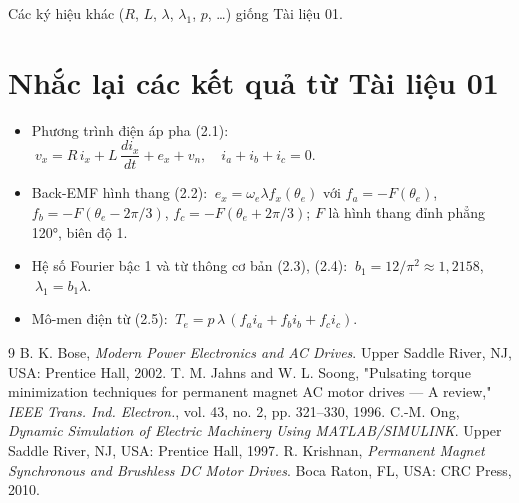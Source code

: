 \documentclass[11pt,a4paper]{article}
\begin{document}
Các ký hiệu khác ($R$, $L$, $\lambda$, $\lambda_1$, $p$, \ldots{}) giống Tài liệu 01.

\section*{Nhắc lại các kết quả từ Tài liệu 01}

\begin{itemize}[leftmargin=*]
\item Phương trình điện áp pha (2.1): $\ v_x = R\,i_x + L\,\dfrac{di_x}{dt} + e_x + v_n,\quad i_a+i_b+i_c = 0.$
\item Back-EMF hình thang (2.2): $\ e_x = \omega_e\lambda f_x(\theta_e)$ với $f_a = -F(\theta_e)$, $f_b = -F(\theta_e - 2\pi/3)$, $f_c = -F(\theta_e + 2\pi/3)$; $F$ là hình thang đỉnh phẳng 120°, biên độ 1.
\item Hệ số Fourier bậc 1 và từ thông cơ bản (2.3), (2.4): $\ b_1 = 12/\pi^2 \approx 1{,}2158$, $\ \lambda_1 = b_1\lambda$.
\item Mô-men điện từ (2.5): $\ T_e = p\,\lambda\,(f_a i_a + f_b i_b + f_c i_c).$
\end{itemize}

\setcounter{section}{2}


\begin{thebibliography}{9}
\small
{} B. K. Bose, \emph{Modern Power Electronics and AC Drives}. Upper Saddle River, NJ, USA: Prentice Hall, 2002.
 T. M. Jahns and W. L. Soong, "Pulsating torque minimization techniques for permanent magnet AC motor drives — A review," \emph{IEEE Trans. Ind. Electron.}, vol. 43, no. 2, pp. 321–330, 1996.
 C.-M. Ong, \emph{Dynamic Simulation of Electric Machinery Using MATLAB/SIMULINK}. Upper Saddle River, NJ, USA: Prentice Hall, 1997.
 R. Krishnan, \emph{Permanent Magnet Synchronous and Brushless DC Motor Drives}. Boca Raton, FL, USA: CRC Press, 2010.
\end{thebibliography}
\end{document}
